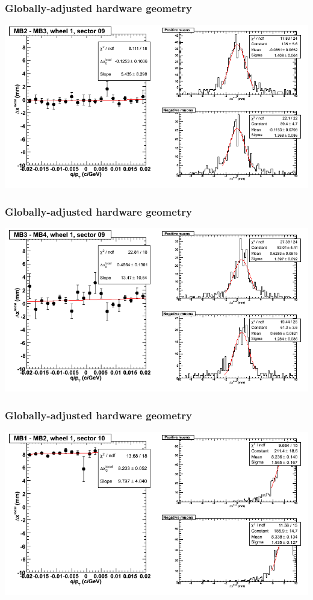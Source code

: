 \documentclass[compress]{beamer}
\begin{document}
\begin{frame}
\frametitle{Globally-adjusted hardware geometry}
\includegraphics[width=\linewidth]{NOV4_segdiffs_HW/dt13_resid_D_09_23.png}
\end{frame}

\begin{frame}
\frametitle{Globally-adjusted hardware geometry}
\includegraphics[width=\linewidth]{NOV4_segdiffs_HW/dt13_resid_D_09_34.png}
\end{frame}

\begin{frame}
\frametitle{Globally-adjusted hardware geometry}
\includegraphics[width=\linewidth]{NOV4_segdiffs_HW/dt13_resid_D_10_12.png}
\end{frame}
\end{document}
